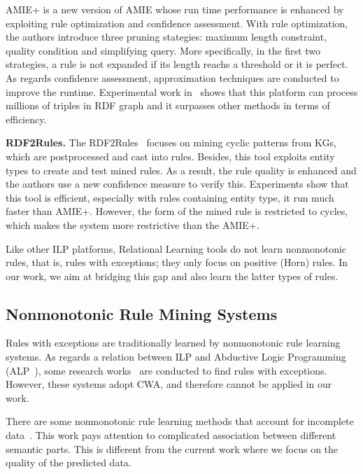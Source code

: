 AMIE+ is a new version of AMIE whose run time performance is enhanced by exploiting rule optimization and confidence assessment. With rule optimization, the authors introduce three pruning stategies: maximum length constraint, quality condition and simplifying query. More specifically, in the first two strategies, a rule is not expanded if its length reachs a threshold or it is perfect. As regards confidence assessment, approximation techniques are conducted to improve the runtime. Experimental work in~\cite{ref10} shows that this platform can process millions of triples in RDF graph and it surpasses other methods in terms of efficiency.

\textbf{RDF2Rules.} The RDF2Rules~\cite{ref29} focuses on mining cyclic patterns from KGs, which are postprocessed and cast into rules. Besides, this tool exploits entity types to create and test mined rules. As a result, the rule quality is enhanced and the authors use a new confidence measure to verify this. Experiments show that this tool is efficient, especially with rules containing entity type, it run much faster than AMIE+. However, the form of the mined rule is restricted to cycles, which makes the system more restrictive than the AMIE+.

Like other ILP platforms, Relational Learning tools do not learn nonmonotonic rules, that is, rules with exceptions; they only focus on positive (Horn) rules. In our work, we aim at bridging this gap and also learn the latter types of rules.

\subsection{Nonmonotonic Rule Mining Systems}
\label{related-work-nonmonotonic-rule-mining-systems}

Rules with exceptions are traditionally learned by nonmonotonic rule learning systems. As regards a relation between ILP and Abductive Logic Programming (ALP~\cite{ref31}), some research works~\cite{ref11, ref32, ref33} are conducted to find rules with exceptions. However, these systems adopt CWA, and therefore cannot be applied in our work.

There are some nonmonotonic rule learning methods that account for incomplete data~\cite{ref34}. This work pays attention to complicated association between different semantic parts. This is different from the current work where we focus on the quality of the predicted data.

